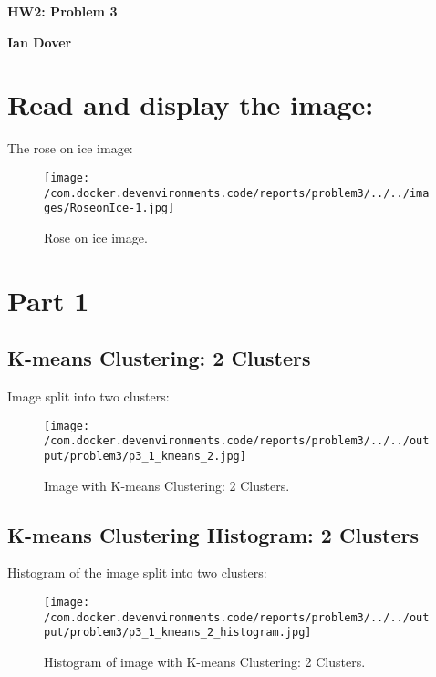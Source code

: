 \documentclass{article}%
\begin{document}
%
\normalsize%
\pagestyle{header}%
\begin{minipage}{\textwidth}%
\centering%
\begin{Large}%
\textbf{HW2: Problem 3}%
\end{Large}%
\linebreak%
\begin{large}%
\textbf{Ian Dover}%
\end{large}%
\end{minipage}%
\section{Read and display the image:}%
\label{sec:Readanddisplaytheimage}%
The rose on ice image:%


\begin{figure}[h!]%
\centering%
\texttt{[image: /com.docker.devenvironments.code/reports/problem3/../../images/RoseonIce-1.jpg]}%
\caption{Rose on ice image.}%
\end{figure}

%
\section{Part 1}%
\label{sec:Part1}%
\subsection{K{-}means Clustering: 2 Clusters}%
\label{subsec:K{-}meansClustering2Clusters}%
Image split into two clusters:%


\begin{figure}[h!]%
\centering%
\texttt{[image: /com.docker.devenvironments.code/reports/problem3/../../output/problem3/p3\_1\_kmeans\_2.jpg]}%
\caption{Image with K{-}means Clustering: 2 Clusters.}%
\end{figure}

%
\subsection{K{-}means Clustering Histogram: 2 Clusters}%
\label{subsec:K{-}meansClusteringHistogram2Clusters}%
Histogram of the image split into two clusters:%


\begin{figure}[h!]%
\centering%
\texttt{[image: /com.docker.devenvironments.code/reports/problem3/../../output/problem3/p3\_1\_kmeans\_2\_histogram.jpg]}%
\caption{Histogram of image with K{-}means Clustering: 2 Clusters.}%
\end{figure}
\end{document}
